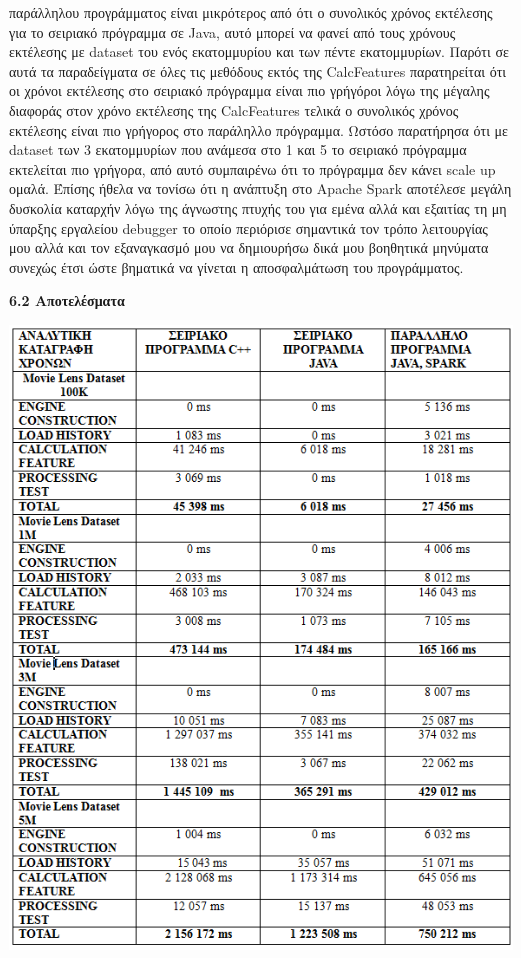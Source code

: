 \documentclass{report}
\begin{document}
{παράλληλου προγράμματος είναι μικρότερος από ότι ο συνολικός χρόνος εκτέλεσης για το σειριακό πρόγραμμα σε \textlatin{Java}, αυτό μπορεί να φανεί από τους χρόνους εκτέλεσης με \textlatin{dataset} του ενός εκατομμυρίου και των πέντε εκατομμυρίων. Παρότι σε αυτά τα παραδείγματα σε όλες τις μεθόδους εκτός της \textlatin{CalcFeatures} παρατηρείται ότι οι χρόνοι εκτέλεσης στο σειριακό πρόγραμμα είναι πιο γρήγόροι λόγω της μέγαλης διαφοράς στον χρόνο εκτέλεσης της \textlatin{CalcFeatures} τελικά ο συνολικός χρόνος εκτέλεσης είναι πιο γρήγορος στο παράληλλο πρόγραμμα. Ωστόσο παρατήρησα ότι με dataset των 3 εκατομμυρίων που ανάμεσα στο 1 και 5 το σειριακό πρόγραμμα εκτελείται πιο γρήγορα, από αυτό συμπαιρένω ότι το πρόγραμμα δεν κάνει \textlatin{scale up} ομαλά. Έπίσης ήθελα να τονίσω ότι η ανάπτυξη στο \textlatin{Apache Spark} αποτέλεσε μεγάλη δυσκολία καταρχήν λόγω της άγνωστης πτυχής του για εμένα αλλά και εξαιτίας τη μη ύπαρξης εργαλείου \textlatin{debugger} το οποίο περιόρισε σημαντικά τον τρόπο λειτουργίας μου αλλά και τον εξαναγκασμό μου να δημιουρήσω δικά μου βοηθητικά μηνύματα συνεχώς έτσι ώστε βηματικά να γίνεται η αποσφαλμάτωση του προγράμματος.


\newpage


\textbf{\large{6.2 Αποτελέσματα}}

\vspace{2mm}

\includegraphics[width=15cm]{table}

}
\end{document}
